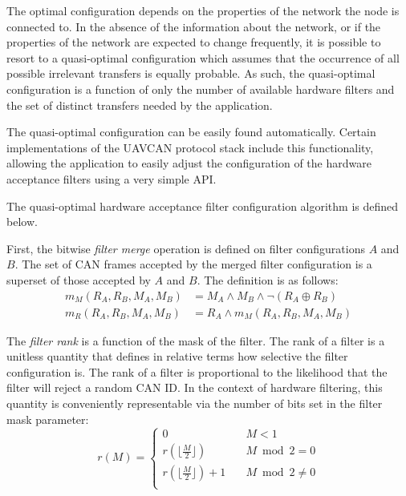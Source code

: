 \begin{remark}[breakable]
    The optimal configuration depends on the properties of the network the node is connected to.
    In the absence of the information about the network,
    or if the properties of the network are expected to change frequently,
    it is possible to resort to a quasi-optimal configuration which assumes that
    the occurrence of all possible irrelevant transfers is equally probable.
    As such, the quasi-optimal configuration is a function of only the number of available hardware filters
    and the set of distinct transfers needed by the application.

    The quasi-optimal configuration can be easily found automatically.
    Certain implementations of the UAVCAN protocol stack include this functionality,
    allowing the application to easily adjust the configuration of the hardware acceptance filters
    using a very simple API.

    The quasi-optimal hardware acceptance filter configuration algorithm is defined below.

    First, the bitwise \emph{filter merge} operation is defined on filter configurations $A$ and $B$.
    The set of CAN frames accepted by the merged filter configuration is a superset of
    those accepted by $A$ and $B$.
    The definition is as follows:
    \begin{equation*}
    \begin{split}
        m_M(R_A, R_B, M_A, M_B) & = M_A \land M_B \land \neg (R_A \oplus R_B) \\
        m_R(R_A, R_B, M_A, M_B) & = R_A \land m_M(R_A, R_B, M_A, M_B)
    \end{split}
    \end{equation*}

    The \emph{filter rank} is a function of the mask of the filter.
    The rank of a filter is a unitless quantity that defines in relative terms how selective the filter
    configuration is.
    The rank of a filter is proportional to the likelihood that the filter will reject a random CAN ID.
    In the context of hardware filtering, this quantity is conveniently representable via the number of bits set in
    the filter mask parameter:
    \begin{equation*}
    r(M) =
    \begin{cases}
        0                                   & \quad M < 1 \\
        r(\lfloor\frac{M}{2}\rfloor)        & \quad M \bmod 2 = 0 \\
        r(\lfloor\frac{M}{2}\rfloor) + 1    & \quad M \bmod 2 \neq 0 \\
    \end{cases}
    \end{equation*}


\end{remark}
